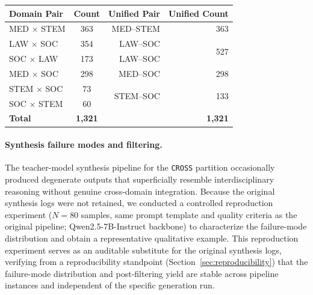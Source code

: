 \documentclass[a4paper,fleql]{cas-sc}
\begin{document}
\vspace{6pt plus 4pt minus 3pt}
\begin{center}
\begingroup
{}
\label{tab:app_cross_pairs}
\renewcommand{\arraystretch}{1.8}
\begin{tabular}{lcrr}
\toprule
\textbf{Domain Pair} & \textbf{Count} & \textbf{Unified Pair} & \textbf{Unified Count} \\
\midrule
MED $\times$ STEM  & 363 & MED--STEM & 363 \\
\midrule
LAW $\times$ SOC   & 354 & LAW--SOC & \multirow{2}{*}{527} \\
SOC $\times$ LAW   & 173 & LAW--SOC & \\
\midrule
MED $\times$ SOC   & 298 & MED--SOC  & 298 \\
\midrule
STEM $\times$ SOC  &  73 & \multirow{2}{*}{STEM--SOC} & \multirow{2}{*}{133} \\
SOC $\times$ STEM  &  60 & & \\
\midrule
\textbf{Total} & \textbf{1,321} & & \textbf{1,321} \\
\bottomrule
\end{tabular}
\endgroup
\end{center}
\vspace{6pt plus 4pt minus 3pt}

\paragraph{Synthesis failure modes and filtering.}
The teacher-model synthesis pipeline for the \texttt{CROSS} partition
occasionally produced degenerate outputs that superficially resemble
interdisciplinary reasoning without genuine cross-domain integration.
Because the original synthesis logs were not retained, we conducted a
controlled reproduction experiment ($N{=}80$ samples, same prompt template
and quality criteria as the original pipeline; Qwen2.5-7B-Instruct
backbone) to characterize the failure-mode distribution and obtain a
representative qualitative example. This reproduction experiment serves as
an auditable substitute for the original synthesis logs, verifying from a
reproducibility standpoint (Section~\ref{sec:reproducibility}) that the
failure-mode distribution and post-filtering yield are stable across
pipeline instances and independent of the specific generation run.
\end{document}

